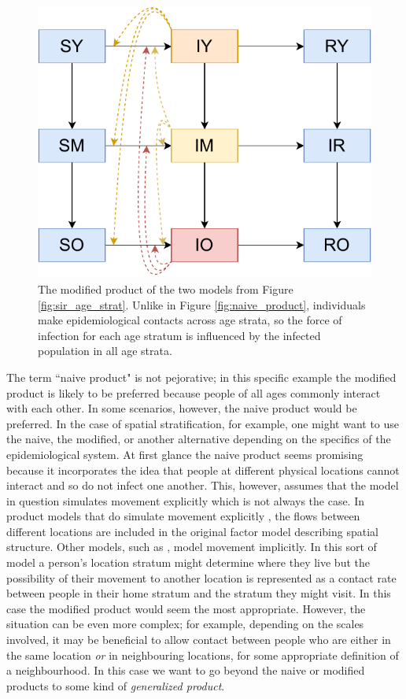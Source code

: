 \documentclass{article}
\theoremstyle{definition}
\newcommand{\define}[1]{\emph{{#1}}}
\begin{document}
\begin{figure}
    \centering
    \includegraphics[width=\textwidth]{images_pdf/Age_stratified_SIR_Modified.pdf}
    \caption{The modified product of the two models from Figure \ref{fig:sir_age_strat}. Unlike in Figure \ref{fig:naive_product}, individuals make epidemiological contacts across age strata, so the force of infection for each age stratum is influenced by the infected population in all age strata.}
    \label{fig:modified_product}
\end{figure}

\FloatBarrier
The term “naive product" is not pejorative; in this specific example the modified product is likely to be preferred because people of all ages commonly interact with each other. In some scenarios, however, the naive product would be preferred. In the case of spatial stratification, for example, one might want to use the naive, the modified, or another alternative depending on the specifics of the epidemiological system. At first glance the naive product seems promising because it incorporates the idea that people at different physical locations cannot interact and so do not infect one another. This, however, assumes that the model in question simulates movement explicitly which is not always the case. In product models that do simulate movement explicitly \cite[e.g.][]{mohammadi2023importation}, the flows between different locations are included in the original factor model describing spatial structure. Other models, such as \cite{dietz1995structured}, model movement implicitly. In this sort of model a person's location stratum might determine where they live but the possibility of their movement to another location is represented as a contact rate between people in their home stratum and the stratum they might visit. In this case the modified product would seem the most appropriate. However, the situation can be even more complex; for example, depending on the scales involved, it may be beneficial to allow contact between people who are either in the same location \emph{or} in neighbouring locations, for some appropriate definition of a neighbourhood. In this case we want to go beyond the naive or modified products to some kind of \define{generalized product}.
\end{document}
